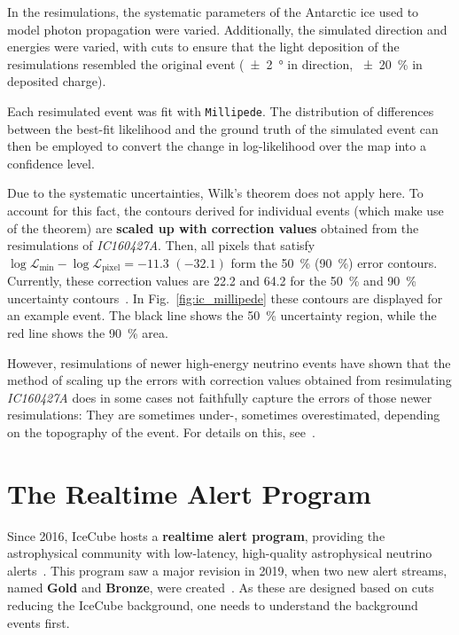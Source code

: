 In the resimulations, the systematic parameters of the Antarctic ice used to model photon propagation were varied. Additionally, the simulated direction and energies were varied, with cuts to ensure that the light deposition of the resimulations resembled the original event (\SI{\pm2}{\degree} in direction, \SI{\pm20}{\percent} in deposited charge).

Each resimulated event was fit with \texttt{Millipede}. The distribution of differences between the best-fit likelihood and the ground truth of the simulated event can then be employed to convert the change in log-likelihood over the map into a confidence level.

Due to the systematic uncertainties, Wilk's theorem does not apply here. To account for this fact, the contours derived for individual events (which make use of the theorem) are \textbf{scaled up with correction values} obtained from the resimulations of \emph{IC160427A}. Then, all pixels that satisfy $\log \mathcal{L}_\text{min}-\log \mathcal{L}_\text{pixel} = -11.3$ $(-32.1)$ form the \SI{50}{\percent} (\SI{90}{\percent}) error contours. Currently, these correction values are 22.2 and 64.2 for the \SI{50}{\percent} and \SI{90}{\percent} uncertainty contours~. In Fig.~\ref{fig:ic_millipede} these contours are displayed for an example event. The black line shows the \SI{50}{\percent} uncertainty region, while the red line shows the \SI{90}{\percent} area.

However, resimulations of newer high-energy neutrino events have shown that the method of scaling up the errors with correction values obtained from resimulating \emph{IC160427A} does in some cases not faithfully capture the errors of those newer resimulations: They are sometimes under-, sometimes overestimated, depending on the topography of the event. For details on this, see~\cite{Gualda2021}.

\section{The Realtime Alert Program}\label{ic_alert_program}
Since 2016, IceCube hosts a \textbf{realtime alert program}, providing the astrophysical community with low-latency, high-quality astrophysical neutrino alerts~\cite{Aartsen2017a}. This program saw a major revision in 2019, when two new alert streams, named \textbf{Gold} and \textbf{Bronze}, were created~. As these are designed based on cuts reducing the IceCube background, one needs to understand the background events first.

